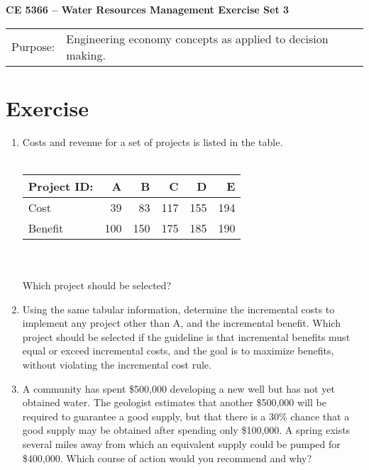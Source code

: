 \documentclass[12pt]{article}
\begin{document}
\begin{center}
{\textbf{{ CE 5366 -- Water Resources Management}  {Exercise Set 3}}}
\end{center}
\begingroup
\begin{tabular}{p{1in} p{5in}}
Purpose: & Engineering economy concepts as applied to decision making. \\
\end{tabular}
\endgroup
\section*{\small{Exercise}}
\begin{enumerate}
\item Costs and revenue for a set of projects is listed in the table. \\ ~\\
\begin{tabular}{lrrrrr}
Project ID: & A & B & C & D & E \\
\hline
\hline
Cost & 39 & 83 & 117 & 155 & 194 \\
Benefit & 100 & 150 & 175 & 185 & 190 \\
\end{tabular}\\~\\
Which project should be selected?  
\item Using the same tabular information, determine the incremental costs to implement any project other than A, and the incremental benefit.  Which project should be selected if the guideline is that incremental benefits must equal or exceed incremental costs, and the goal is to maximize benefits, without violating the incremental cost rule.
\item A community has spent \$500,000 developing a new well but has not yet obtained water.  The geologist estimates that another \$500,000 will be required to guarantee a good supply, but that there is a 30\% chance that a good supply may be obtained after spending only \$100,000.  A spring exists several miles away from which an equivalent supply could be pumped for \$400,000.   Which course of action would you recommend and why?
\end{enumerate}
\end{document}
